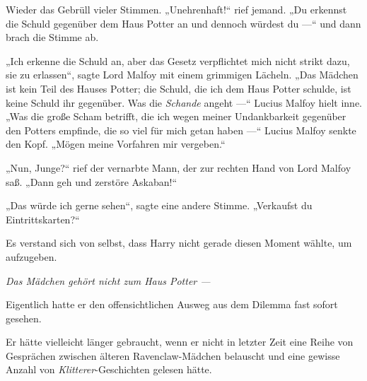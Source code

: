 Wieder das Gebrüll vieler Stimmen.
„Unehrenhaft!“ rief jemand.
„Du erkennst die Schuld gegenüber dem Haus Potter an und dennoch würdest du —“ und dann brach die Stimme ab.

„Ich erkenne die Schuld an, aber das Gesetz verpflichtet mich nicht strikt dazu, sie zu erlassen“, sagte Lord Malfoy mit einem grimmigen Lächeln.
„Das Mädchen ist kein Teil des Hauses Potter; die Schuld, die ich dem Haus Potter schulde, ist keine Schuld ihr gegenüber. Was die \emph{Schande} angeht —“ Lucius Malfoy hielt inne.
„Was die große Scham betrifft, die ich wegen meiner Undankbarkeit gegenüber den Potters empfinde, die so viel für mich getan haben —“
Lucius Malfoy senkte den Kopf.
„Mögen meine Vorfahren mir vergeben.“

„Nun, Junge?“ rief der vernarbte Mann, der zur rechten Hand von Lord Malfoy saß.
„Dann geh und zerstöre Askaban!“

„Das würde ich gerne sehen“, sagte eine andere Stimme.
„Verkaufst du Eintrittskarten?“

Es verstand sich von selbst, dass Harry nicht gerade diesen Moment wählte, um aufzugeben.

\emph{Das Mädchen gehört nicht zum Haus Potter —}

Eigentlich hatte er den offensichtlichen Ausweg aus dem Dilemma fast sofort gesehen.

Er hätte vielleicht länger gebraucht, wenn er nicht in letzter Zeit eine Reihe von Gesprächen zwischen älteren Ravenclaw-Mädchen belauscht und eine gewisse Anzahl von \emph{Klitterer}-Geschichten gelesen hätte.

